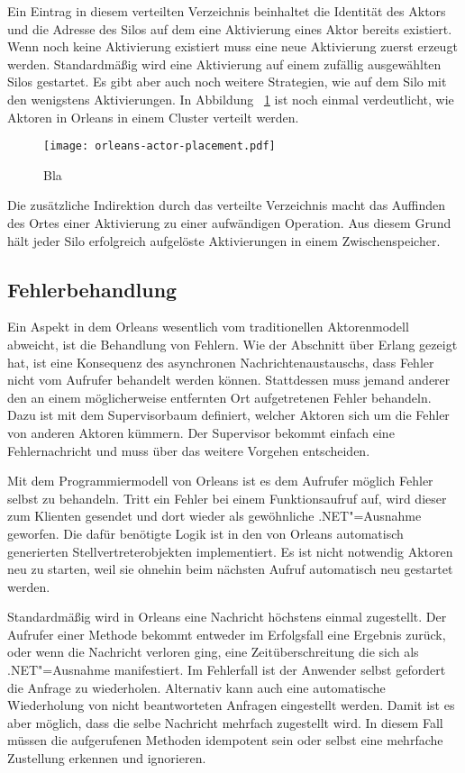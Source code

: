 Ein Eintrag in diesem verteilten Verzeichnis beinhaltet die Identität des Aktors und die Adresse des Silos auf dem eine Aktivierung eines Aktor bereits existiert. Wenn noch keine Aktivierung existiert muss eine neue Aktivierung zuerst erzeugt werden. Standardmäßig wird eine Aktivierung auf einem zufällig ausgewählten Silos gestartet. Es gibt aber auch noch weitere Strategien, wie \zB auf dem Silo mit den wenigstens Aktivierungen. In Abbildung ~\ref{fig:orleans-acor-placement} ist noch einmal verdeutlicht, wie Aktoren in Orleans in einem Cluster verteilt werden.

\begin{figure}[!hbt]%
\texttt{[image: orleans-actor-placement.pdf]}%
\caption{Bla}%
\label{fig:orleans-acor-placement}%
\end{figure}

Die zusätzliche Indirektion durch das verteilte Verzeichnis macht das Auffinden des Ortes einer Aktivierung zu einer aufwändigen Operation. Aus diesem Grund hält jeder Silo erfolgreich aufgelöste Aktivierungen in einem Zwischenspeicher.

\subsection{Fehlerbehandlung}

Ein Aspekt in dem Orleans wesentlich vom traditionellen Aktorenmodell abweicht, ist die Behandlung von Fehlern. Wie der Abschnitt über Erlang gezeigt hat, ist eine Konsequenz des asynchronen Nachrichtenaustauschs, dass Fehler nicht vom Aufrufer behandelt werden können. Stattdessen muss jemand anderer den an einem möglicherweise entfernten Ort aufgetretenen Fehler behandeln. Dazu ist mit dem Supervisorbaum definiert, welcher Aktoren sich um die Fehler von anderen Aktoren kümmern. Der Supervisor bekommt einfach eine Fehlernachricht und muss über das weitere Vorgehen entscheiden.

Mit dem Programmiermodell von Orleans ist es dem Aufrufer möglich Fehler selbst zu behandeln. Tritt ein Fehler bei einem Funktionsaufruf auf, wird dieser zum Klienten gesendet und dort wieder als gewöhnliche .NET"=Ausnahme geworfen. Die dafür benötigte Logik ist in den von Orleans automatisch generierten Stellvertreterobjekten implementiert. Es ist nicht notwendig Aktoren neu zu starten, weil sie ohnehin beim nächsten Aufruf automatisch neu gestartet werden.

Standardmäßig wird in Orleans eine Nachricht höchstens einmal zugestellt. Der Aufrufer einer Methode bekommt entweder im Erfolgsfall eine Ergebnis zurück, oder wenn die Nachricht verloren ging, eine Zeitüberschreitung die sich als .NET"=Ausnahme manifestiert. Im Fehlerfall ist der Anwender selbst gefordert die Anfrage zu wiederholen. Alternativ kann auch eine automatische Wiederholung von nicht beantworteten Anfragen eingestellt werden. Damit ist es aber möglich, dass die selbe Nachricht mehrfach zugestellt wird. In diesem Fall müssen die aufgerufenen Methoden idempotent sein oder selbst eine mehrfache Zustellung erkennen und ignorieren.

